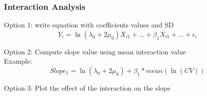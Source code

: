 \documentclass[xcolor=table]{beamer}
\begin{document}
\begin{frame}
	\frametitle{Interaction Analysis}
	
	Option 1: write equation with coefficients values and SD
	\begin{equation}
		Y_i = \ln(\lambda_0 + 2\mu_0) X_{i1} + ... + \beta_1 X_{i5} + ... + \epsilon_i
	\end{equation}

	Option 2: Compute slope value using mean interaction value\\
	Example:
	\begin{equation}
		Slope_1 = \ln(\lambda_0 + 2\mu_0) + \beta_1  * mean(\ln(CV))
	\end{equation}

	Option 3: Plot the effect of the interaction on the slope
	
	
\end{frame}

\end{document}
